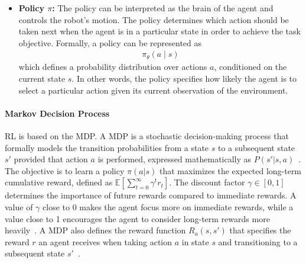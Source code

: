\begin{itemize}
	\item \textbf{Policy $\pi$:}
	The policy can be interpreted as the brain of the agent and controls the robot's motion. The policy determines which action should be taken next when the agent is in a particular state in order to achieve the task objective. 
	Formally, a policy can be represented as  
	\begin{align}
		\pi_\theta(a \mid s)  
	\end{align}
	which defines a probability distribution over actions $a$, conditioned on the current state $s$. In other words, the policy specifies how likely the agent is to select a particular action given its current observation of the environment. 

\end{itemize}





\paragraph{Markov Decision Process}

\ac{RL} is based on the \ac{MDP}. A \ac{MDP} is a stochastic decision-making process that formally models the transition probabilities from a state $s$ to a subsequent state $s'$ provided that action $a$ is performed, expressed mathematically as $P(s'|s,a)$~\cite{sutton2018reinforcement, millerMarkovDecisionProcesses}. 
The objective is to learn a policy $\pi(a|s)$ that maximizes the expected long-term cumulative reward, defined as $\mathbb{E}\left[\sum_{t=0}^{\infty} \gamma^t r_t\right]$. The discount factor $\gamma \in [0,1]$ determines the importance of future rewards compared to immediate rewards. A value of $\gamma$ close to 0 makes the agent focus more on immediate rewards, while a value close to 1 encourages the agent to consider long-term rewards more heavily~\cite{sutton2018reinforcement, jagtapUnderstandingMarkovDecision}.
A \ac{MDP} also defines the reward function $R_a(s,s')$ that specifies the reward $r$ an agent receives when taking action $a$ in state $s$ and transitioning to a subsequent state $s'$~\cite{sutton2018reinforcement, millerMarkovDecisionProcesses}.

